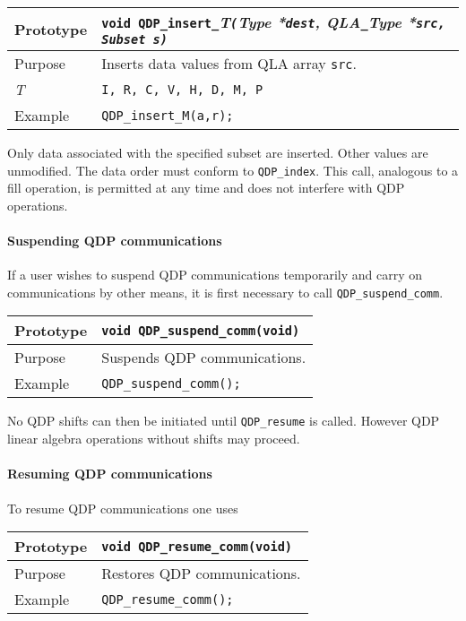 \documentclass{article}
\newcommand{\allNumericTypes}{{\tt I, R, C, V, H, D, M, P}}
\newcommand{\ttdash}{{\tt \_}}
\newcommand{\itt}{\it T}
\newcommand{\extraarg}{, Subset s}
\begin{document}
\begin{flushleft}
\begin{tabular}{|l|l|}
  \hline
  Prototype      & {\tt void QDP}\ttdash{\tt insert}\ttdash\itt{\tt (}{\it Type *}{\tt dest}, {\it QLA}\ttdash{\it Type *}{\tt src\extraarg)}\\
\hline
Purpose        & Inserts data values from QLA array {\tt src}. \\
\hline
  \itt     & \allNumericTypes \\
\hline
Example  & \verb|QDP_insert_M(a,r);| \\
\hline
  \end{tabular}
\end{flushleft}
%
Only data associated with the specified subset are inserted.  Other
values are unmodified.  The data order must conform to
\verb|QDP_index|.  This call, analogous to a fill operation, is
permitted at any time and does not interfere with QDP operations.

\paragraph{Suspending QDP communications}

If a user wishes to suspend QDP communications temporarily and carry
on communications by other means, it is first necessary to call
\verb|QDP_suspend_comm|.

\begin{flushleft}
\begin{tabular}{|l|l|}
  \hline
  Prototype      & \verb|void QDP_suspend_comm(void)| \\
\hline
Purpose        & Suspends QDP communications. \\
\hline
Example  & \verb|QDP_suspend_comm();| \\
\hline
  \end{tabular}
\end{flushleft}
%
No QDP shifts can then be initiated until \verb|QDP_resume| is called.
However QDP linear algebra operations without shifts may proceed.

\paragraph{Resuming QDP communications}

To resume QDP communications one uses
\begin{flushleft}
\begin{tabular}{|l|l|}
  \hline
  Prototype      & \verb|void QDP_resume_comm(void)| \\
\hline
Purpose        & Restores QDP communications. \\
\hline
Example  & \verb|QDP_resume_comm();| \\
\hline
  \end{tabular}
\end{flushleft}
\end{document}
